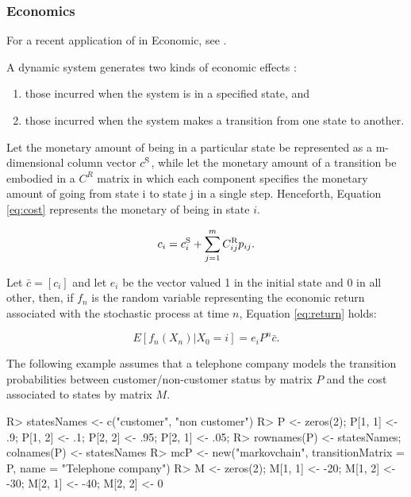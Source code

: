 \documentclass[article,nojss]{jss}
\providecommand{\tightlist}{%
  \setlength{\itemsep}{0pt}\setlength{\parskip}{0pt}}
\begin{document}
\hypertarget{fin:ec}{%
\subsubsection{Economics}\label{fin:ec}}

For a recent application of  in Economic, see \cite{manchesterR}.

A dynamic system generates two kinds of economic effects \citep{bardPpt}:

\begin{enumerate}
\def\labelenumi{\arabic{enumi}.}
\tightlist
\item
  those incurred when the system is in a specified state, and
\item
  those incurred when the system makes a transition from one state to another.
\end{enumerate}

Let the monetary amount of being in a particular state be represented as a m-dimensional column vector \(c^{\rm{S}}\), while let the monetary amount of a transition be embodied in a \(C^{R}\) matrix in which each component specifies the monetary amount of going from state i to state j in a single step. Henceforth, Equation \eqref{eq:cost} represents the monetary of being in state \(i\).

\begin{equation}
{c_i} = c_i^{\rm{S}} + \sum\limits_{j = 1}^m {C_{ij}^{\rm{R}}} {p_{ij}}.
\label{eq:cost}
\end{equation}

Let \(\bar c = \left[ c_i \right]\) and let \(e_i\) be the vector valued 1 in the initial state and 0 in all other, then, if \(f_n\) is the random variable representing the economic return associated with the stochastic process at time \(n\), Equation \eqref{eq:return} holds:

\begin{equation}
E\left[ {{f_n}\left( {{X_n}} \right)|{X_0} = i} \right] = {e_i}{P^n}\bar c.
\label{eq:return}
\end{equation}

The following example assumes that a telephone company models the transition probabilities between customer/non-customer status by matrix \(P\) and the cost associated to states by matrix \(M\).

\begin{CodeChunk}

\begin{CodeInput}
R> statesNames <- c("customer", "non customer")
R> P <- zeros(2); P[1, 1] <- .9; P[1, 2] <- .1; P[2, 2] <- .95; P[2, 1] <- .05;
R> rownames(P) <- statesNames; colnames(P) <- statesNames
R> mcP <- new("markovchain", transitionMatrix = P, name = "Telephone company")
R> M <- zeros(2); M[1, 1] <- -20; M[1, 2] <- -30; M[2, 1] <- -40; M[2, 2] <- 0
\end{CodeInput}
\end{CodeChunk}
\end{document}

